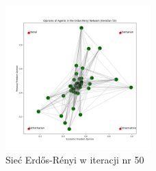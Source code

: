 \begin{figure}
    \centering
    \includegraphics[width=0.5\textwidth]{img/Erdos-Renyi.png}
    \caption{Sieć Erdős-Rényi w iteracji nr 50}
    \label{fig:Erdos-Renyi_plot_example}
\end{figure}
